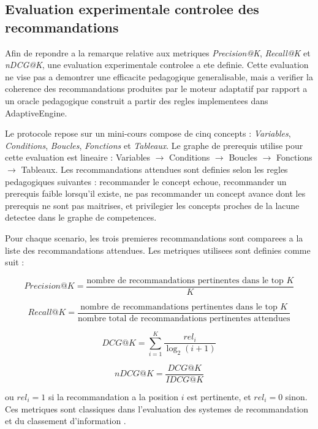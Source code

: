 \subsection{Evaluation experimentale controlee des recommandations}

Afin de repondre a la remarque relative aux metriques \textit{Precision@K},
\textit{Recall@K} et \textit{nDCG@K}, une evaluation experimentale controlee
a ete definie. Cette evaluation ne vise pas a demontrer une efficacite
pedagogique generalisable, mais a verifier la coherence des recommandations
produites par le moteur adaptatif par rapport a un oracle pedagogique construit
a partir des regles implementees dans AdaptiveEngine.

Le protocole repose sur un mini-cours compose de cinq concepts :
\textit{Variables}, \textit{Conditions}, \textit{Boucles}, \textit{Fonctions}
et \textit{Tableaux}. Le graphe de prerequis utilise pour cette evaluation est
lineaire : Variables $\rightarrow$ Conditions $\rightarrow$ Boucles
$\rightarrow$ Fonctions $\rightarrow$ Tableaux. Les recommandations attendues
sont definies selon les regles pedagogiques suivantes : recommander le concept
echoue, recommander un prerequis faible lorsqu'il existe, ne pas recommander un
concept avance dont les prerequis ne sont pas maitrises, et privilegier les
concepts proches de la lacune detectee dans le graphe de competences.

Pour chaque scenario, les trois premieres recommandations sont comparees a la
liste des recommandations attendues. Les metriques utilisees sont definies
comme suit :

\[
Precision@K = \frac{\text{nombre de recommandations pertinentes dans le top } K}{K}
\]

\[
Recall@K = \frac{\text{nombre de recommandations pertinentes dans le top } K}
{\text{nombre total de recommandations pertinentes attendues}}
\]

\[
DCG@K = \sum_{i=1}^{K} \frac{rel_i}{\log_2(i+1)}
\]

\[
nDCG@K = \frac{DCG@K}{IDCG@K}
\]

ou $rel_i = 1$ si la recommandation a la position $i$ est pertinente, et
$rel_i = 0$ sinon. Ces metriques sont classiques dans l'evaluation des systemes
de recommandation et du classement d'information
\citep{herlocker2004evaluating,jarvelin2002cumulated}.

